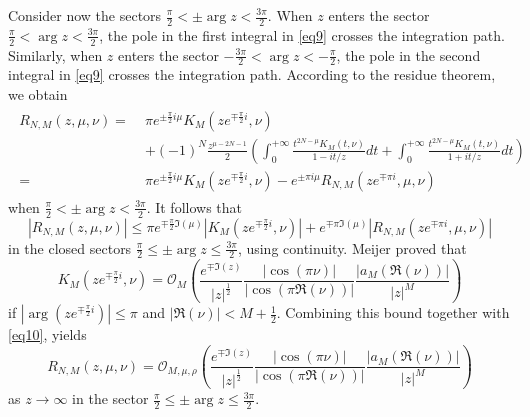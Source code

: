 \documentclass[a4paper,twoside,10pt]{amsart}
\numberwithin{equation}{section}
\begin{document}
Consider now the sectors $\frac{\pi }{2} < \pm \arg z < \frac{{3\pi }}{2}$. When $z$ enters the sector $\frac{\pi}{2}< \arg z < \frac{3\pi}{2}$, the pole in the first integral in \eqref{eq9} crosses the integration path. Similarly, when $z$ enters the sector $-\frac{3\pi}{2}< \arg z < -\frac{\pi}{2}$, the pole in the second integral in \eqref{eq9} crosses the integration path. According to the residue theorem, we obtain
\begin{gather}\label{eq16}
\begin{split}
R_{N,M} \left( {z,\mu ,\nu } \right) = \; & \pi e^{ \pm \frac{\pi }{2}i\mu } K_M \left( {ze^{ \mp \frac{\pi }{2}i} ,\nu } \right) \\ & + \left( { - 1} \right)^N \frac{{z^{\mu  - 2N - 1} }}{2}\left( {\int_0^{ + \infty } {\frac{{t^{2N - \mu } K_M \left( {t,\nu } \right)}}{{1 - it/z}}dt}  + \int_0^{ + \infty } {\frac{{t^{2N - \mu } K_M \left( {t,\nu } \right)}}{{1 + it/z}}dt} } \right)\\
 = \; & \pi e^{ \pm \frac{\pi }{2}i\mu } K_M \left( {ze^{ \mp \frac{\pi }{2}i} ,\nu } \right) - e^{ \pm \pi i\mu } R_{N,M} \left( {ze^{ \mp \pi i} ,\mu ,\nu } \right)
\end{split}
\end{gather}
when $\frac{\pi }{2} <  \pm \arg z < \frac{{3\pi }}{2}$. It follows that
\[
\left| {R_{N,M} \left( {z,\mu ,\nu } \right)} \right| \le \pi e^{ \mp \frac{\pi }{2}\Im \left( \mu  \right)} \left| {K_M \left( {ze^{ \mp \frac{\pi }{2}i} ,\nu } \right)} \right| + e^{ \mp \pi \Im \left( \mu  \right)} \left| {R_{N,M} \left( {ze^{ \mp \pi i} ,\mu ,\nu } \right)} \right|
\]
in the closed sectors $\frac{\pi }{2} \leq \pm \arg z \leq \frac{{3\pi }}{2}$, using continuity. Meijer \cite{Meijer} proved that
\[
K_M \left( {ze^{ \mp \frac{\pi }{2}i} ,\nu } \right) = \mathcal{O}_M \left( {\frac{{e^{ \mp \Im \left( z \right)} }}{{\left| z \right|^{\frac{1}{2}} }}\frac{{\left| {\cos \left( {\pi \nu } \right)} \right|}}{{\left| {\cos \left( {\pi \Re \left( \nu  \right)} \right)} \right|}}\frac{{\left| {a_M \left( \Re \left( \nu  \right)  \right)} \right|}}{{\left| z \right|^M }}} \right)
\]
if $\left| {\arg \left( {ze^{ \mp \frac{\pi }{2}i} } \right)} \right| \leq \pi$ and $\left| {\Re \left( \nu  \right)} \right| < M + \frac{1}{2}$. Combining this bound together with \eqref{eq10}, yields
\[
R_{N,M} \left( {z,\mu ,\nu } \right) = \mathcal{O}_{M,\mu ,\rho } \left( {\frac{{e^{ \mp \Im \left( z \right)} }}{{\left| z \right|^{\frac{1}{2}} }}\frac{{\left| {\cos \left( {\pi \nu } \right)} \right|}}{{\left| {\cos \left( {\pi \Re \left( \nu  \right)} \right)} \right|}}\frac{{\left| {a_M \left( \Re \left( \nu  \right) \right)} \right|}}{{\left| z \right|^M }}} \right)
\]
as $z \to \infty$ in the sector $\frac{\pi }{2} \leq \pm \arg z \leq \frac{{3\pi }}{2}$.
\end{document}
